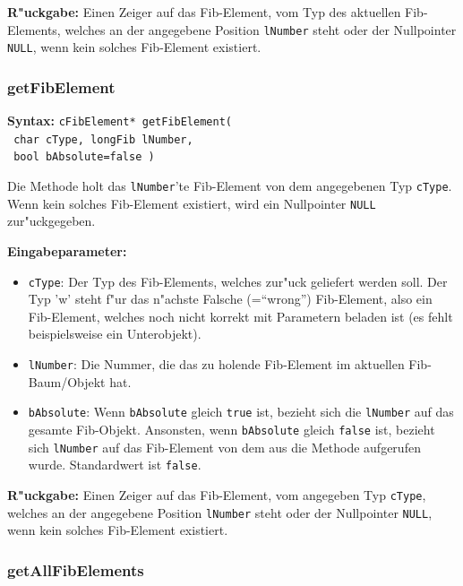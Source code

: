 \bigskip\noindent
\textbf{R"uckgabe:} Einen Zeiger auf das Fib-Element, vom Typ des aktuellen Fib-Elements, welches an der angegebene Position \verb|lNumber| steht oder der Nullpointer \verb|NULL|, wenn kein solches Fib-Element existiert.


\subsubsection{getFibElement}

\textbf{Syntax:} \verb|cFibElement* getFibElement(| \\\verb| char cType, longFib lNumber,| \\\verb| bool bAbsolute=false )|

\bigskip\noindent
Die Methode holt das \verb|lNumber|'te Fib-Element von dem angegebenen Typ \verb|cType|. Wenn kein solches Fib-Element existiert, wird ein Nullpointer \verb|NULL| zur"uckgegeben.

\bigskip\noindent
\textbf{Eingabeparameter:}
\begin{itemize}
 \item \verb|cType|: Der Typ des Fib-Elements, welches zur"uck geliefert werden soll. Der Typ 'w' steht f"ur das n"achste Falsche (=``wrong'') Fib-Element, also ein Fib-Element, welches noch nicht korrekt mit Parametern beladen ist (es fehlt beispielsweise ein Unterobjekt).
 \item \verb|lNumber|: Die Nummer, die das zu holende Fib-Element im aktuellen Fib-Baum/Objekt hat.
 \item \verb|bAbsolute|: Wenn \verb|bAbsolute| gleich \verb|true| ist, bezieht sich die \verb|lNumber| auf das gesamte Fib-Objekt. Ansonsten, wenn \verb|bAbsolute| gleich \verb|false| ist, bezieht sich \verb|lNumber| auf das Fib-Element von dem aus die Methode aufgerufen wurde. Standardwert ist \verb|false|.
\end{itemize}

\bigskip\noindent
\textbf{R"uckgabe:} Einen Zeiger auf das Fib-Element, vom angegeben Typ \verb|cType|, welches an der angegebene Position \verb|lNumber| steht oder der Nullpointer \verb|NULL|, wenn kein solches Fib-Element existiert.


\subsubsection{getAllFibElements}

